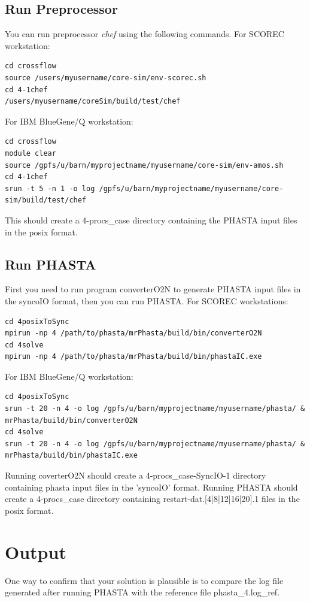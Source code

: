 \documentclass{article}
\begin{document}
\subsection{Run Preprocessor}
You can run preprocessor \textit{chef} using the following commands. For SCOREC workstation:
\begin{lstlisting}
cd crossflow
source /users/myusername/core-sim/env-scorec.sh
cd 4-1chef
/users/myusername/coreSim/build/test/chef 
\end{lstlisting}
For IBM BlueGene/Q workstation:
\begin{lstlisting}
cd crossflow
module clear
source /gpfs/u/barn/myprojectname/myusername/core-sim/env-amos.sh
cd 4-1chef
srun -t 5 -n 1 -o log /gpfs/u/barn/myprojectname/myusername/core-sim/build/test/chef
\end{lstlisting}

This should create a 4-procs\_case directory containing the PHASTA input files in the posix format.

\subsection{Run PHASTA}

First you need to run program converterO2N to generate PHASTA input files in the syncoIO format, then you can run PHASTA. For SCOREC workstations: 
\begin{lstlisting}
cd 4posixToSync
mpirun -np 4 /path/to/phasta/mrPhasta/build/bin/converterO2N 
cd 4solve
mpirun -np 4 /path/to/phasta/mrPhasta/build/bin/phastaIC.exe 
\end{lstlisting}
For IBM BlueGene/Q workstation:
\begin{lstlisting}
cd 4posixToSync
srun -t 20 -n 4 -o log /gpfs/u/barn/myprojectname/myusername/phasta/ & 
mrPhasta/build/bin/converterO2N
cd 4solve
srun -t 20 -n 4 -o log /gpfs/u/barn/myprojectname/myusername/phasta/ &
mrPhasta/build/bin/phastaIC.exe
\end{lstlisting}
Running coverterO2N should create a 4-procs\_case-SyncIO-1 directory containing phasta input files in the 'syncoIO' format.
Running PHASTA should create a 4-procs\_case directory containing restart-dat.[4|8|12|16|20].1 files in the posix format.

\section{Output}

One way to confirm that your solution is plausible is to compare the log file generated after running PHASTA with the reference file phasta\_4.log\_ref.
\end{document}
